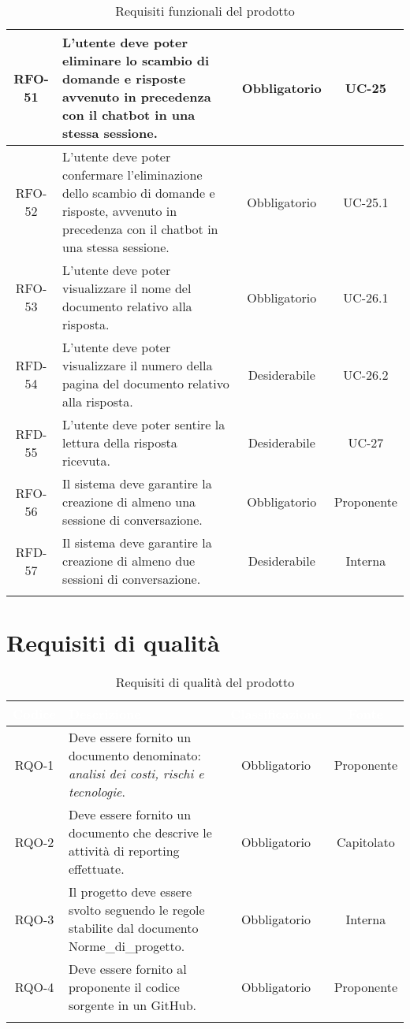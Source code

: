 \begin{xltabular}{\textwidth}{| c | X | c | c |}
    \hline
    RFO-51 & L’utente deve poter eliminare lo scambio di domande e risposte avvenuto in precedenza con il chatbot in una stessa sessione. & Obbligatorio & UC-25 \\
    \hline
    RFO-52 & L’utente deve poter confermare l'eliminazione dello scambio di domande e risposte, avvenuto in precedenza con il chatbot in una stessa sessione. & Obbligatorio & UC-25.1 \\
    \hline
    RFO-53 & L’utente deve poter visualizzare il nome del documento relativo alla risposta. & Obbligatorio & UC-26.1 \\
    \hline
    RFD-54 & L'utente deve poter visualizzare il numero della pagina del documento relativo alla risposta. & Desiderabile & UC-26.2 \\
    \hline
    RFD-55 & L’utente deve poter sentire la lettura della risposta ricevuta. & Desiderabile & UC-27 \\
    \hline
    RFO-56 & Il sistema deve garantire la creazione di almeno una sessione di conversazione. & Obbligatorio & Proponente\\ %
    \hline
    RFD-57 & Il sistema deve garantire la creazione di almeno due sessioni di conversazione. & Desiderabile & Interna\\ %
    \hline
     \caption{Requisiti funzionali del prodotto}
    \label{tab:reqfun}
\end{xltabular}
\endgroup

\section{Requisiti di qualità}

\begingroup
\setlength{\tabcolsep}{10pt}
\renewcommand{\arraystretch}{1.5}
\begin{xltabular}{\textwidth}{| c | X | c | c |}
    \hline
     \textbf{\textcolor{white}{Codice}} & \textbf{\textcolor{white}{Descrizione}} & \textbf{\textcolor{white}{Classificazione}} & \textbf{\textcolor{white}{Fonte}}\\
    \hline
    \endhead
    RQO-1 & Deve essere fornito un documento denominato:\textit{ analisi dei costi, rischi e tecnologie}. & Obbligatorio & Proponente \\
    \hline
    RQO-2 & Deve essere fornito un documento che descrive le attività di  reporting effettuate. & Obbligatorio & Capitolato \\
    \hline
    RQO-3 & Il progetto deve essere svolto seguendo le regole stabilite dal documento Norme\_di\_progetto. & Obbligatorio & Interna \\
    \hline
    RQO-4 & Deve essere fornito al proponente il codice sorgente in un  GitHub. & Obbligatorio & Proponente \\
    \hline
     \caption{Requisiti di qualità del prodotto}
    \label{tab:reqqua}
\end{xltabular}
\endgroup
\newpage
